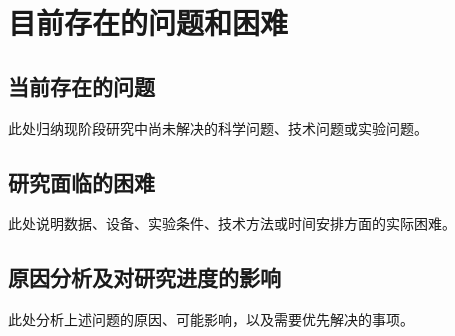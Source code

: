 \chapter{目前存在的问题和困难}

\section{当前存在的问题}
此处归纳现阶段研究中尚未解决的科学问题、技术问题或实验问题。

\section{研究面临的困难}
此处说明数据、设备、实验条件、技术方法或时间安排方面的实际困难。

\section{原因分析及对研究进度的影响}
此处分析上述问题的原因、可能影响，以及需要优先解决的事项。
